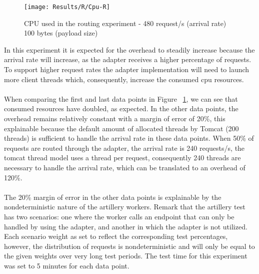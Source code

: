 \begin{figure}[htbp]
    \centering
    \texttt{[image: Results/R/Cpu-R]}
    \caption{CPU used in the routing experiment - 480 request/s (arrival rate) 100 bytes (payload size)}
    \label{fig:routCpu}
\end{figure}

In this experiment it is expected for the overhead to steadily increase because the arrival rate will increase, as the adapter receives a higher percentage of requests. To support higher request rates
the adapter implementation will need to launch more client threads which, consequently, increase the consumed cpu resources.
    
\paragraph{}

When comparing the first and last data points in Figure ~\ref{fig:routCpu}, we can see that consumed resources have doubled, as expected.
In the other data points, the overhead remains relatively constant with a margin of error of 20\%,
this explainable because the default amount of allocated threads by Tomcat (200 threads) is sufficient to handle the arrival rate in these data points.
When 50\% of requests are routed through the adapter, the arrival rate is 240 requests/s, the tomcat thread model uses a thread per request,
consequently 240 threads are necessary to handle the arrival rate, which can be translated to an overhead of 120\%.

\paragraph{}

The 20\% margin of error in the other data points is explainable by the nondeterministic nature of the artillery workers.
Remark that the artillery test has two scenarios: one where the worker calls an endpoint that can only be handled by using the adapter, and another in which the adapter is not utilized.
Each scenario weight as set to reflect the corresponding test percentages,
however, the distribution of requests is nondeterministic and will only be equal to the given weights over very long test periods.
The test time for this experiment was set to 5 minutes for each data point.

\paragraph{}

